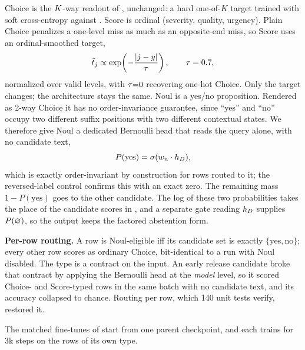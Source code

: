 Choice is the $K$-way readout of , unchanged: a hard one-of-$K$
target trained with soft cross-entropy against . Score is ordinal
(severity, quality, urgency). Plain Choice penalizes a one-level miss as much as an opposite-end miss, so
Score uses an ordinal-smoothed target,
\begin{equation}
  \label{eq:ordinal-smooth}
  \tilde{t}_j \propto \exp\!\left(-\frac{|j - y|}{\tau}\right), \qquad \tau = 0.7,
\end{equation}
normalized over valid levels, with $\tau{=}0$ recovering one-hot Choice. Only the target changes; the
architecture stays the same. Noul is a yes/no proposition. Rendered as 2-way Choice it has no
order-invariance guarantee, since ``yes'' and ``no'' occupy two different suffix positions with two
different contextual states. We therefore give Noul a dedicated Bernoulli head that reads the query
alone, with no candidate text,
\begin{equation}
  \label{eq:bernoulli-noul}
  P(\text{yes}) = \sigma(w_n \cdot h_D),
\end{equation}
which is exactly order-invariant by construction for rows routed to it; the reversed-label control
confirms this with an exact zero. The remaining mass $1{-}P(\text{yes})$ goes to the other candidate. The log of
these two probabilities takes the place of the candidate scores in , and a
separate gate reading $h_D$ supplies $P(\varnothing)$, so the output keeps the factored abstention form.

\textbf{Per-row routing.} A row is Noul-eligible iff its candidate set is exactly
$\{\text{yes},\text{no}\}$; every other row scores as ordinary Choice, bit-identical to a run with Noul
disabled. The type is a contract on the input. An early release candidate broke that contract by
applying the Bernoulli head at the \emph{model} level, so it scored Choice- and Score-typed rows in the
same batch with no candidate text, and its accuracy collapsed to chance. Routing per row, which 140 unit
tests verify, restored it.

The matched fine-tunes of  start from one parent checkpoint, and each trains
for 3k steps on the rows of its own type.

